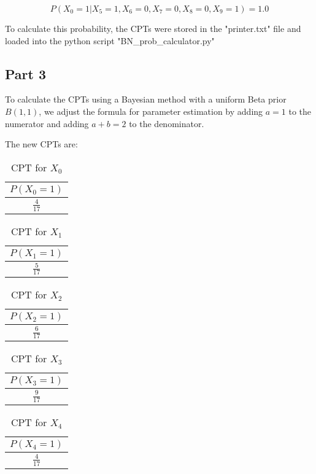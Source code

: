 \documentclass{article}
\begin{document}
\[
P(X_0 = 1 | X_5 = 1, X_6 = 0, X_7 = 0, X_8 = 0, X_9 = 1) = 1.0
\]

To calculate this probability, the CPTs were stored in the "printer.txt" file and loaded into the python script "BN\_prob\_calculator.py"


\subsection*{Part 3}

To calculate the CPTs using a Bayesian method with a uniform Beta prior $B(1,1)$, we adjust the formula for parameter estimation by adding $a=1$ to the numerator and adding $a+b=2$ to the denominator.


The new CPTs are:


\begin{table}[H]
\centering
\begin{tabular}{|c|}
\hline
$P(X_0 = 1)$  \\ \hline
$\frac{4}{17}$ \\ \hline
\end{tabular}
\caption{CPT for $X_0$}
\end{table}

\begin{table}[H]
\centering
\begin{tabular}{|c|}
\hline
$P(X_1 = 1)$  \\ \hline
$\frac{5}{17}$ \\ \hline
\end{tabular}
\caption{CPT for $X_1$}
\end{table}

\begin{table}[H]
\centering
\begin{tabular}{|c|}
\hline
$P(X_2 = 1)$  \\ \hline
$\frac{6}{17}$  \\ \hline
\end{tabular}
\caption{CPT for $X_2$}
\end{table}

\begin{table}[H]
\centering
\begin{tabular}{|c|}
\hline
$P(X_3 = 1)$  \\ \hline
$\frac{9}{17}$ \\ \hline
\end{tabular}
\caption{CPT for $X_3$}
\end{table}

\begin{table}[H]
\centering
\begin{tabular}{|c|}
\hline
$P(X_4 = 1)$  \\ \hline
$\frac{4}{17}$  \\ \hline
\end{tabular}
\caption{CPT for $X_4$}
\end{table}
\end{document}
